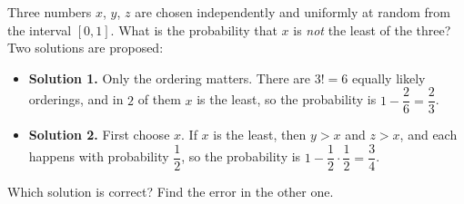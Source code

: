 Three numbers $x$, $y$, $z$ are chosen independently and uniformly at random from the interval $[0,1]$. What is the probability that $x$ is \emph{not} the least of the three? Two solutions are proposed:
\begin{itemize}
\item \textbf{Solution 1.} Only the ordering matters. There are $3!=6$ equally likely orderings, and in $2$ of them $x$ is the least, so the probability is $1-\dfrac{2}{6}=\dfrac{2}{3}$.
\item \textbf{Solution 2.} First choose $x$. If $x$ is the least, then $y>x$ and $z>x$, and each happens with probability $\dfrac{1}{2}$, so the probability is $1-\dfrac{1}{2}\cdot\dfrac{1}{2}=\dfrac{3}{4}$.
\end{itemize}
Which solution is correct? Find the error in the other one.
